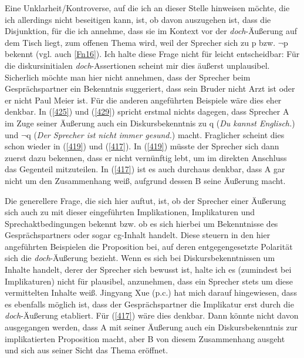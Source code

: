 Eine Unklarheit/Kontroverse, auf die ich an dieser Stelle hinweisen möchte, die ich allerdings nicht beseitigen kann, ist, ob davon auszugehen ist, dass die Disjunktion, für die ich annehme, dass sie im Kontext vor der \textit{doch}-Äußerung auf dem Tisch liegt, zum offenen Thema wird, weil der Sprecher sich zu p bzw. $\neg$p bekennt (vgl. auch \ref{Fn16}). Ich halte diese Frage nicht für leicht entscheidbar: Für die diskursinitialen \textit{doch}-Assertionen scheint mir dies äußerst unplausibel. Sicherlich möchte man hier nicht annehmen, dass der Sprecher beim Gesprächs\-partner ein Bekenntnis suggeriert, dass sein Bruder nicht Arzt ist oder er nicht Paul Meier ist. Für die anderen angeführten Beispiele wäre dies eher denkbar. In (\ref{425}) und (\ref{429}) spricht erstmal nichts dagegen, dass Sprecher A im Zuge seiner Äußerung auch ein Diskursbekenntnis zu q (\textit{Du kannst Englisch.}) und $\neg$q (\textit{Der Sprecher ist nicht immer gesund.}) macht. Fraglicher scheint dies schon wieder in (\ref{419}) und (\ref{417}). In (\ref{419}) müsste der Sprecher sich dann zuerst dazu bekennen, dass er nicht vernünftig lebt, um im direkten Anschluss das Gegenteil mitzuteilen. In (\ref{417}) ist es auch durchaus denkbar, dass A gar nicht um den Zusammenhang weiß, aufgrund dessen B seine Äußerung macht. 

Die generellere Frage, die sich hier auftut, ist, ob der Sprecher einer Äußerung sich auch zu mit dieser eingeführten  Implikationen, Implikaturen  und Sprechaktbedingungen  bekennt bzw. ob es sich hierbei um Bekenntnisse des Gesprächspartners oder sogar cg-Inhalt handelt. Diese steuern in den hier angeführten Beispielen die Proposition bei, auf deren entgegengesetzte Polarität sich die \textit{doch}-Äuße\-rung bezieht. Wenn es sich bei Diskursbekenntnissen  um Inhalte handelt, derer der Sprecher sich bewusst ist, halte ich es (zumindest bei Implikaturen) nicht für plausibel, anzunehmen, dass ein Sprecher stets um diese vermittelten Inhalte weiß. Jingyang Xue (p.c.) hat mich darauf hingewiesen, dass es ebenfalls möglich ist, dass der Gesprächspartner die Implikatur erst durch die \textit{doch}-Äußerung etabliert. Für (\ref{417}) wäre dies denkbar. Dann könnte nicht davon ausgegangen werden, dass A mit seiner Äußerung auch ein Diskursbekenntnis zur implikatierten Proposition macht, aber B von diesem Zusammenhang ausgeht und sich aus seiner Sicht das Thema eröffnet.

